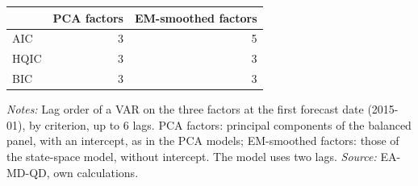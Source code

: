 \begin{threeparttable}
\begin{tabular}{lrr}
\toprule
 & PCA factors & EM-smoothed factors \\
\midrule
AIC & 3 & 5 \\
HQIC & 3 & 3 \\
BIC & 3 & 3 \\
\bottomrule
\end{tabular}
\begin{tablenotes}[flushleft]\footnotesize
\item \textit{Notes:} Lag order of a VAR on the three factors at the first forecast date (2015-01), by criterion, up to 6 lags. PCA factors: principal components of the balanced panel, with an intercept, as in the PCA models; EM-smoothed factors: those of the state-space model, without intercept. The model uses two lags. \textit{Source:} EA-MD-QD, own calculations.
\end{tablenotes}
\end{threeparttable}
